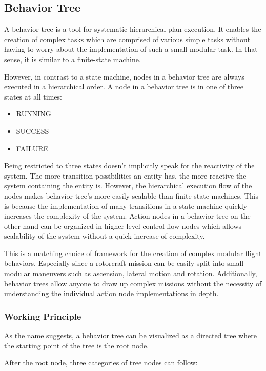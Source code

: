 \subsection{Behavior Tree}\label{subsec:setup:behavior_tree}

A behavior tree is a tool for systematic hierarchical plan execution. It enables the creation of complex tasks which are comprised of various simple tasks without having to worry about the implementation of such a small modular task. In that sense, it is similar to a finite-state machine.

However, in contrast to a state machine, nodes in a behavior tree are always executed in a hierarchical order. A node in a behavior tree is in one of three states at all times: 

\begin{itemize}
    \item RUNNING
    \item SUCCESS
    \item FAILURE
\end{itemize}

Being restricted to three states doesn't implicitly speak for the reactivity of the system. The more transition possibilities an entity has, the more reactive the system containing the entity is. However, the hierarchical execution flow of the nodes makes behavior tree's more easily scalable than finite-state machines. This is because the implementation of many transitions in a state machine quickly increases the complexity of the system. Action nodes in a behavior tree on the other hand can be organized in higher level control flow nodes which allows scalability of the system without a quick increase of complexity.

This is a matching choice of framework for the creation of complex modular flight behaviors. Especially since a rotorcraft mission can be easily split into small modular maneuvers such as ascension, lateral motion and rotation. Additionally, behavior trees allow anyone to draw up complex missions without the necessity of understanding the individual action node implementations in depth.

\subsubsection{Working Principle}
As the name suggests, a behavior tree can be visualized as a directed tree where the starting point of the tree is the root node. 

After the root node, three categories of tree nodes can follow:

